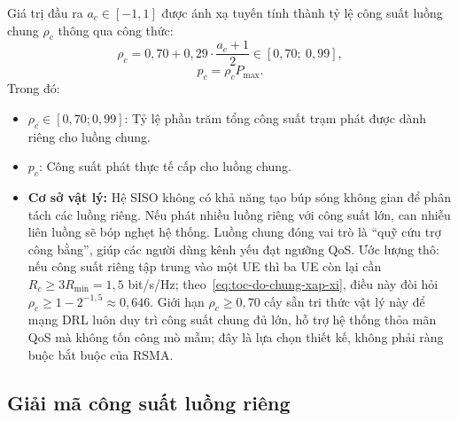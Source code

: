 Giá trị đầu ra $a_c \in [-1, 1]$ được ánh xạ tuyến tính thành tỷ lệ công suất luồng chung $\rho_c$ thông qua
công thức:
\begin{equation}
\rho_c = 0,70 + 0,29 \cdot \frac{a_c + 1}{2} \in [0,70;\ 0,99],
\label{eq:rho-c}
\end{equation}
\begin{equation}
p_c = \rho_c P_{\max}.
\label{eq:p-c}
\end{equation}
Trong đó:
\begin{itemize}
\item $\rho_c \in [0,70; 0,99]$: Tỷ lệ phần trăm tổng công suất trạm phát được dành riêng cho luồng chung.
\item $p_c$: Công suất phát thực tế cấp cho luồng chung.
\item \textbf{Cơ sở vật lý:} Hệ SISO không có khả năng tạo búp sóng không gian để phân tách các luồng riêng. Nếu
  phát nhiều luồng riêng với công suất lớn, can nhiễu liên luồng sẽ bóp nghẹt hệ thống. Luồng chung đóng vai trò
  là ``quỹ cứu trợ công bằng'', giúp các người dùng kênh yếu đạt ngưỡng QoS. Ước lượng thô: nếu công suất riêng
  tập trung vào một UE thì ba UE còn lại cần $R_c \ge 3R_{\min} = 1,5$ bit/s/Hz; theo~\eqref{eq:toc-do-chung-xap-xi},
  điều này đòi hỏi $\rho_c \ge 1 - 2^{-1,5} \approx 0,646$. Giới hạn $\rho_c \ge 0,70$ cấy sẵn tri thức vật lý
  này để mạng DRL luôn duy trì công suất chung đủ lớn, hỗ trợ hệ thống thỏa mãn QoS mà không tốn công mò mẫm;
  đây là lựa chọn thiết kế, không phải ràng buộc bắt buộc của RSMA.
\end{itemize}

\subsection{Giải mã công suất luồng riêng}
\label{ssec:giai-ma-rieng}

